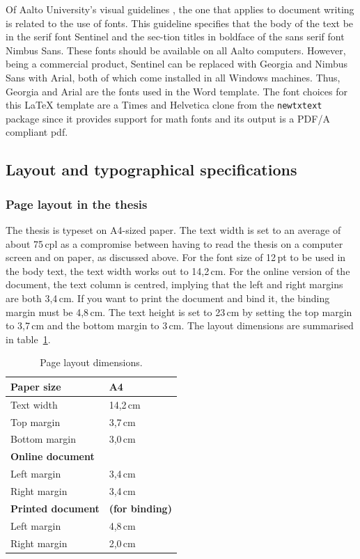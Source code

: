 \documentclass[english, 12pt, a4paper, sci, utf8, a-2b, online]{aaltothesis}
\begin{document}
Of Aalto University’s visual guidelines \cite{aaltovisual}, the one that applies
to document writing is related to the use of fonts. This guideline specifies 
that the body of the text be in the serif font Sentinel and the sec-tion titles 
in boldface of the sans serif font Nimbus Sans. These fonts should be available 
on all Aalto computers. However, being a commercial product, Sentinel can be 
replaced with Georgia and Nimbus Sans with Arial, both of which come installed 
in all Windows machines. Thus, Georgia and Arial are the fonts used in the Word 
template. The font choices for this \LaTeX{} template are a Times and Helvetica 
clone from the \verb+newtxtext+ package since it provides support for math fonts
and its output is a PDF/A compliant pdf.

\subsection*{Layout and typographical specifications}
\subsubsection*{Page layout in the thesis}

The thesis is typeset on A4-sized paper. The text width is set to an average of 
about 75\,cpl as a compromise between having to read the thesis on a computer 
screen and on paper, as discussed above. For the font size of 12\,pt to be used 
in the body text, the text width works out to 14,2\,cm. For the online version 
of the document, the text column is centred, implying that the left and right 
margins are both 3,4\,cm. If you want to print the document and bind it, the 
binding margin must be 4,8\,cm. The text height is set to 23\,cm by setting the 
top margin to 3,7\,cm and the bottom margin to 3\,cm. The layout dimensions are 
summarised in table~\ref{tab:layout}.

\begin{table}[htb]
	\centering
	\caption{Page layout dimensions.}
	\label{tab:layout}
	\sffamily%
	\begin{tabular}{ll}
		\hline
		Paper size & A4\\\hline
		Text width & 14,2\,cm \\\hline
		Top margin & 3,7\,cm \\\hline
		Bottom margin & 3,0\,cm \\\hline
		\textbf{Online document} & \\\hline
		Left margin & 3,4\,cm \\\hline
		Right margin & 3,4\,cm \\\hline
		\textbf{Printed document} & \textbf{(for binding)} \\\hline
		Left margin & 4,8\,cm \\\hline
		Right margin & 2,0\,cm \\\hline
	\end{tabular}
\end{table}
\end{document}
